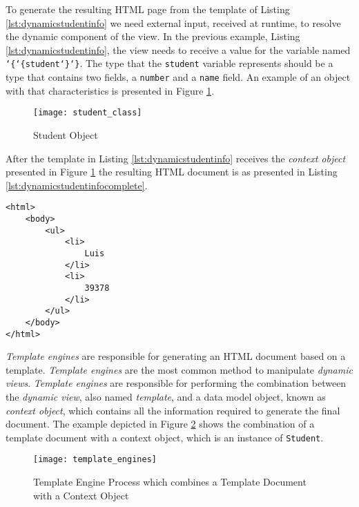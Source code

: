 \noindent
To generate the resulting \ac{HTML} page from the template of Listing \ref{lst:dynamicstudentinfo} we need external input, received at runtime, to resolve the dynamic component of the view. In the previous example, Listing \ref{lst:dynamicstudentinfo}, the view needs to receive a value for the variable named \texttt{\char`\{\char`\{student\char`\}\char`\}}. The type that the \texttt{student} variable represents should be a type that contains two fields, a \texttt{number} and a \texttt{name} field. An example of an object with that characteristics is presented in Figure \ref{img:studentclass}.

\begin{figure}[H]
	\centering
	\texttt{[image: student\_class]}
	\caption{Student Object}
	\label{img:studentclass}
\end{figure}

\noindent
After the template in Listing \ref{lst:dynamicstudentinfo} receives the \textit{context object} presented in Figure \ref{img:studentclass} the resulting \ac{HTML} document is as presented in Listing \ref{lst:dynamicstudentinfocomplete}.

\bigskip

\lstset{language=html}

\begin{minipage}{\linewidth}
\begin{lstlisting}[caption={HTML Document with Student information}, label={lst:dynamicstudentinfocomplete}]
<html>
    <body>
        <ul>
            <li>
                Luis
            </li>
            <li>
                39378
            </li>
        </ul>
    </body>
</html>
\end{lstlisting}
\end{minipage} 

\textit{Template engines} are responsible for generating an \ac{HTML} document based on a template. \textit{Template engines} are the most common method to manipulate \textit{dynamic views}. \textit{Template engines} are responsible for performing the combination between the \textit{dynamic view}, also named \textit{template}, and a data model object, known as \textit{context object}, which contains all the information required to generate the final document. The example depicted in Figure \ref{img:templateengineprocess} shows the combination of a template document with a context object, which is an instance of \texttt{Student}.

\begin{figure}[H]
	\centering
	\texttt{[image: template\_engines]}
	\caption{Template Engine Process which combines a Template Document with a Context Object}
	\label{img:templateengineprocess}
\end{figure}

